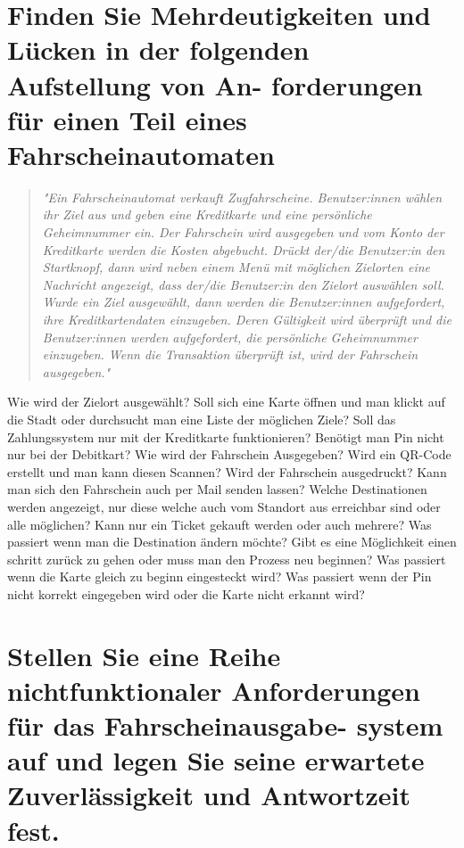 \documentclass[12pt]{article}
\begin{document}
\section{Finden Sie Mehrdeutigkeiten und Lücken in der folgenden Aufstellung von An- forderungen für einen Teil
eines Fahrscheinautomaten}
\begin{quote}
\textit{"Ein Fahrscheinautomat verkauft Zugfahrscheine. Benutzer:innen wählen ihr Ziel aus und geben eine Kreditkarte und eine persönliche Geheimnummer ein. Der Fahrschein wird ausgegeben und vom Konto der
Kreditkarte werden die Kosten abgebucht. Drückt der/die Benutzer:in den Startknopf, dann wird neben einem Menü mit möglichen Zielorten eine Nachricht angezeigt, dass der/die Benutzer:in den Zielort auswählen soll. Wurde ein Ziel ausgewählt, dann werden die Benutzer:innen aufgefordert, ihre Kreditkartendaten
einzugeben. Deren Gültigkeit wird überprüft und die Benutzer:innen werden aufgefordert, die persönliche
Geheimnummer einzugeben. Wenn die Transaktion überprüft ist, wird der Fahrschein ausgegeben."}
\end{quote}
Wie wird der Zielort ausgewählt? Soll sich eine Karte öffnen und man klickt auf die Stadt oder durchsucht man eine Liste der möglichen Ziele? Soll das Zahlungssystem nur mit der Kreditkarte funktionieren? Benötigt man Pin nicht nur bei der Debitkart? Wie wird der Fahrschein Ausgegeben? Wird ein QR-Code erstellt und man kann diesen Scannen? Wird der Fahrschein ausgedruckt? Kann man sich den Fahrschein auch per Mail senden lassen? Welche Destinationen werden angezeigt, nur diese welche auch vom Standort aus erreichbar sind oder alle möglichen? Kann nur ein Ticket gekauft werden oder auch mehrere? Was passiert wenn man die Destination ändern möchte? Gibt es eine Möglichkeit einen schritt zurück zu gehen oder muss man den Prozess neu beginnen? Was passiert wenn die Karte gleich zu beginn eingesteckt wird? Was passiert wenn der Pin nicht korrekt eingegeben wird oder die Karte nicht erkannt wird?

\section{Stellen Sie eine Reihe nichtfunktionaler Anforderungen für das Fahrscheinausgabe- system auf und legen
Sie seine erwartete Zuverlässigkeit und Antwortzeit fest.}
\end{document}
